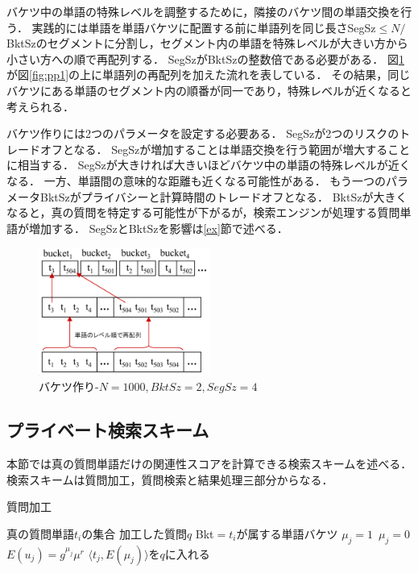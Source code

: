 \documentclass{jsarticle}
\theoremstyle{definition}
\begin{document}
バケツ中の単語の特殊レベルを調整するために，隣接のバケツ間の単語交換を行う．
実践的には単語を単語バケツに配置する前に単語列を同じ長さSegSz$\leq N/$BktSzのセグメントに分割し，セグメント内の単語を特殊レベルが大きい方から小さい方への順で再配列する．
SegSzがBktSzの整数倍である必要がある．
図\ref{fig:pp2}が図\ref{fig:pp1}の上に単語列の再配列を加えた流れを表している．
その結果，同じバケツにある単語のセグメント内の順番が同一であり，特殊レベルが近くなると考えられる．


バケツ作りには2つのパラメータを設定する必要ある．
SegSzが2つのリスクのトレードオフとなる．
SegSzが増加することは単語交換を行う範囲が増大することに相当する．
SegSzが大きければ大きいほどバケツ中の単語の特殊レベルが近くなる．
一方、単語間の意味的な距離も近くなる可能性がある．
もう一つのパラメータBktSzがプライバシーと計算時間のトレードオフとなる．
BktSzが大きくなると，真の質問を特定する可能性が下がるが，検索エンジンが処理する質問単語が増加する．
SegSzとBktSzを影響は\ref{ex}節で述べる．

\begin{figure}
    \centering
    \includegraphics[width=0.5\textwidth,height=0.3\textwidth,natwidth=1600,natheight=1196]{rk13.png}
	\caption{バケツ作り-$N=1000,BktSz=2,SegSz=4$}\label{fig:pp2}
\end{figure}

\subsection{プライベート検索スキーム}
本節では真の質問単語だけの関連性スコアを計算できる検索スキームを述べる．
検索スキームは質問加工，質問検索と結果処理三部分からなる．

\begin{algorithm}
\caption{質問加工}
\begin{algorithmic}[1]
	\Require 真の質問単語$t_i$の集合
	\Ensure 加工した質問$q$
	\State Bkt$=t_i$が属する単語バケツ
		 $\mu_j=1$
		\Else $\,\mu_j=0$
		\EndIf
		\State $E(u_j) = g^{\mu_j}\mu^r$
		\State $\langle t_j,E(\mu_j)\rangle$を$q$に入れる
		\EndFor
	\EndFor
\EndFunction
\end{algorithmic}
\end{algorithm}
\end{document}
